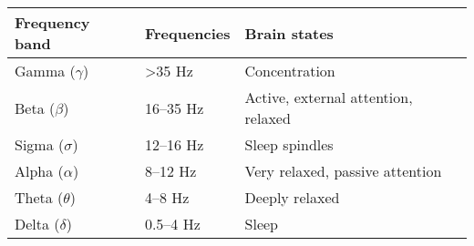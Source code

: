 \begin{tabular}{lll}
    \toprule
    Frequency band & Frequencies & Brain states \\
    \midrule
    Gamma ($\gamma$) & >35 Hz & Concentration \\
    Beta ($\beta$) & 16--35 Hz & Active, external attention, relaxed \\
    Sigma ($\sigma$) & 12--16 Hz & Sleep spindles \\
    Alpha ($\alpha$) & 8--12 Hz & Very relaxed, passive attention \\
    Theta ($\theta$) & 4--8 Hz & Deeply relaxed \\
    Delta ($\delta$) & 0.5--4 Hz & Sleep \\
    \bottomrule
\end{tabular}
